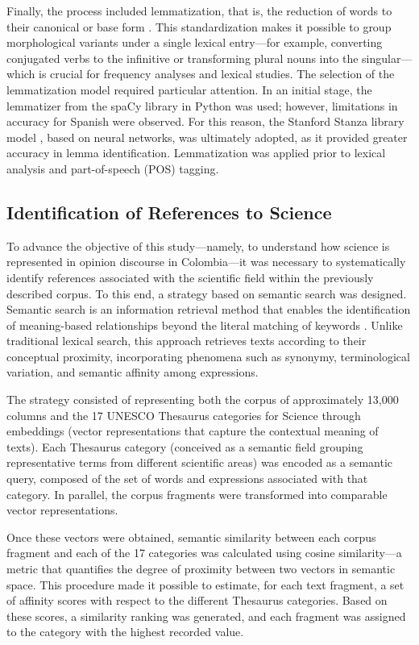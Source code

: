 \documentclass[pdflatex,sn-mathphys-num,iicol]{sn-jnl}
\begin{document}
	Finally, the process included lemmatization, that is, the reduction of words to their canonical or base form \cite{Orellana2018}. This standardization makes it possible to group morphological variants under a single lexical entry—for example, converting conjugated verbs to the infinitive or transforming plural nouns into the singular—which is crucial for frequency analyses and lexical studies. The selection of the lemmatization model required particular attention. In an initial stage, the lemmatizer from the spaCy library in Python was used; however, limitations in accuracy for Spanish were observed. For this reason, the Stanford Stanza library model \cite{qi2020stanza}, based on neural networks, was ultimately adopted, as it provided greater accuracy in lemma identification. Lemmatization was applied prior to lexical analysis and part-of-speech (POS) tagging.\\

	
	\subsection{Identification of References to Science}\label{subsec:identification}
	
	To advance the objective of this study---namely, to understand how science is represented in opinion discourse in Colombia---it was necessary to systematically identify references associated with the scientific field within the previously described corpus. To this end, a strategy based on semantic search was designed. Semantic search is an information retrieval method that enables the identification of meaning-based relationships beyond the literal matching of keywords \cite{Wei2022}. Unlike traditional lexical search, this approach retrieves texts according to their conceptual proximity, incorporating phenomena such as synonymy, terminological variation, and semantic affinity among expressions.
	
	The strategy consisted of representing both the corpus of approximately 13,000 columns and the 17 UNESCO Thesaurus categories for Science through embeddings (vector representations that capture the contextual meaning of texts). Each Thesaurus category (conceived as a semantic field grouping representative terms from different scientific areas) was encoded as a semantic query, composed of the set of words and expressions associated with that category. In parallel, the corpus fragments were transformed into comparable vector representations.
	
	
	Once these vectors were obtained, semantic similarity between each corpus fragment and each of the 17 categories was calculated using cosine similarity---a metric that quantifies the degree of proximity between two vectors in semantic space. This procedure made it possible to estimate, for each text fragment, a set of affinity scores with respect to the different Thesaurus categories. Based on these scores, a similarity ranking was generated, and each fragment was assigned to the category with the highest recorded value.
	
\end{document}
